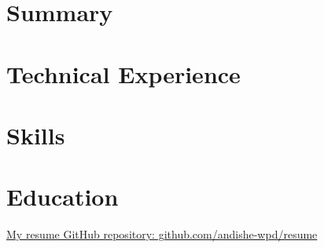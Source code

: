 \documentclass[letter,10pt]{article}
\begin{document}
\section{Summary}



\section{Technical Experience}


\section{Skills}


\section{Education}


             \item{}
             \item{}
             \item{}
             \item{}

\hfill \href{https://github.com/andishe-wpd/resume}{ My resume GitHub repository: github.com/andishe-wpd/resume}
\end{document}
